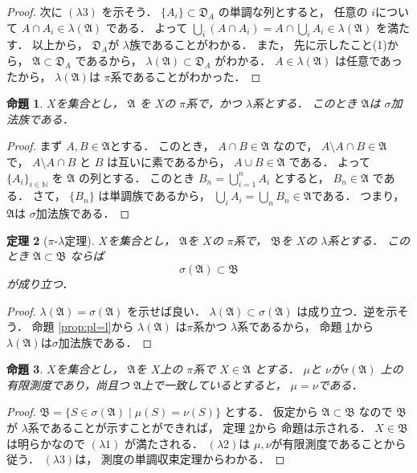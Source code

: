\documentclass[leqno, a4paper, 12pt]{jsarticle}
\newtheorem{thm}{定理}
\newtheorem{prop}[thm]{命題}
\newcommand{\nn}{\mathbb{N}}
\begin{document}
\begin{proof}
次に
$(\lambda 3)$
を示そう．
$\{A_i\}\subset \mathfrak{D}_{A}$
の単調な列とすると，
任意の
$i$について
$A\cap A_i\in \lambda(\mathfrak{A})$
である．
 よって
 $\bigcup_{i}(A\cap A_{i})=A\cap \bigcup_{i}A_{i}
 \in \lambda(\mathfrak{A})$
 を満たす．
 以上から，
 $\mathfrak{D}_A$が
 $\lambda$族であることがわかる．
 また，
 先に示したこと(1)から，
 $\mathfrak{A}\subset \mathfrak{D}_{A}$
 であるから，
 $\lambda(\mathfrak{A})\subset \mathfrak{D}_{A}$
 がわかる．
 $A\in \lambda(\mathfrak{A})$
 は任意であったから，
 $\lambda(\mathfrak{A})$は
 $\pi$系であることがわかった．
\end{proof}

\begin{prop}\label{prop:pl=s}
$X$を集合とし，
$\mathfrak{A}$
を
$X$の
$\pi$系で，かつ
$\lambda$系とする．
このとき
$\mathfrak{A}$は
$\sigma$加法族である．
\end{prop}
\begin{proof}
まず
$A, B\in \mathfrak{A}$とする．
このとき，
$A\cap B\in \mathfrak{A}$
なので，
$A\setminus A\cap B\in \mathfrak{A}$
で，
$A\setminus A\cap B$
と
$B$
は互いに素であるから，
$A\cup B\in \mathfrak{A}$
である．
よって
$\{A_{i}\}_{i\in \nn}$
を
$\mathfrak{A}$
の列とする．
このとき
$B_{n}=\bigcup_{i=1}^{n}A_{i}$
とすると，
$B_{n}\in \mathfrak{A}$
である．
さて，
$\{B_{n}\}$
は単調族であるから， 
$\bigcup_{i}A_{i}=\bigcup_{n}B_{n}\in
 \mathfrak{A}$である．
つまり，
$\mathfrak{A}$は
$\sigma$加法族である．
\end{proof}


\begin{thm}[$\pi$-$\lambda$定理]\label{thm:plthm}
$X$を集合とし，
$\mathfrak{A}$を
$X$の
$\pi$系で，
$\mathfrak{B}$を
$X$の
$\lambda$系とする．
このとき
$\mathfrak{A}\subset \mathfrak{B}$
ならば
\[
\sigma(\mathfrak{A})\subset \mathfrak{B}
\]
が成り立つ．
\end{thm}
\begin{proof}
$\lambda(\mathfrak{A})=\sigma(\mathfrak{A})$
を示せば良い．
$\lambda(\mathfrak{A})\subset \sigma(\mathfrak{A})$
は成り立つ．逆を示そう．
命題 \ref{prop:pl=l}から
$\lambda(\mathfrak{A})$
は$\pi$系かつ
$\lambda$系であるから，
命題 \ref{prop:pl=s}から
$\lambda(\mathfrak{A})$は$\sigma$加法族である．
\end{proof}

\begin{prop}\label{prop:equal}
$X$を集合とし，
$\mathfrak{A}$を
$X$上の
$\pi$系で
$X\in \mathfrak{A}$
とする．
$\mu$と
$\nu$が$\sigma(\mathfrak{A})$
上の有限測度であり，尚且つ
$\mathfrak{A}$上で一致しているとすると，
$\mu=\nu$である．
\end{prop}
\begin{proof}
$\mathfrak{B}=\{S\in \sigma(\mathfrak{A})\mid \mu(S)=\nu(S)\}$
とする．
仮定から
$\mathfrak{A}\subset \mathfrak{B}$
なので
$\mathfrak{B}$が
$\lambda$系であることが示すことができれば，
定理 \ref{thm:plthm}から
命題は示される．
$X\in \mathfrak{B}$
は明らかなので
$(\lambda 1)$
が満たされる．
$(\lambda2)$は
$\mu, \nu$が有限測度であることから従う．
$(\lambda3)$は，
測度の単調収束定理からわかる．
\end{proof}
\end{document}
